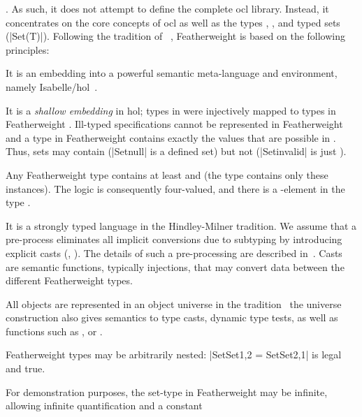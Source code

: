 . As such, it does not attempt to define the complete
\acs{ocl} library. Instead, it concentrates on the core concepts of
\acs{ocl} as well as the types ,
, and typed sets (\inlineocl|Set(T)|).  Following
the tradition of
\holocl~\cite{brucker.ea:hol-ocl:2008,brucker.ea:hol-ocl-book:2006},
Featherweight \OCL is based on the following principles:
\begin{compactenum}
\item It is an embedding into a powerful semantic meta-language and
  environment, namely
  Isabelle/\acs{hol}~\cite{nipkow.ea:isabelle:2002}.
\item It is a \emph{shallow embedding} in \acs{hol}; types
  in \OCL were injectively mapped to types in Featherweight
  \OCL. Ill-typed \OCL specifications cannot be represented in
  Featherweight \OCL and a type in Featherweight \OCL contains exactly
  the values that are possible in \OCL. Thus, sets may contain
   (\inlineocl|Set{null}| is a defined set) but not
   (\inlineocl|Set{invalid}| is just
  ).
\item Any Featherweight \OCL type contains at least
   and  (the type 
  contains only these instances). The logic is consequently
  four-valued, and there is a -element in the type
  .
\item It is a strongly typed language in the Hindley-Milner tradition.
  We assume that a pre-process eliminates all implicit conversions due
  to subtyping by introducing explicit casts (\eg,
  ). The details of such a pre-processing are
  described in~\cite{brucker:interactive:2007}.  Casts are semantic
  functions, typically injections, that may convert data between the
  different Featherweight \OCL types.
\item All objects are represented in an object universe in the \holocl
  tradition~\cite{brucker.ea:extensible:2008-b} the universe
  construction also gives semantics to type casts, dynamic type
  tests, as well as functions such as ,
  or .
\item Featherweight \OCL types may be arbitrarily nested:
  \inlineocl|Set{Set{1,2}} = Set{Set{2,1}}| is legal and true.
\item For demonstration purposes, the set-type in Featherweight \OCL
  may be infinite, allowing infinite quantification and a constant

\end{compactenum}
